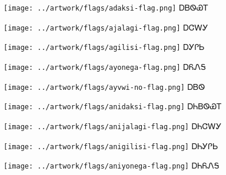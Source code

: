 \documentclass[avery5371]{flashcards}%
\begin{document}

\begin{flashcard}{
\texttt{[image: ../artwork/flags/adaksi-flag.png]}
}\Huge ᎠᏴᏫᏯᎢ
\end{flashcard}

\begin{flashcard}{
\texttt{[image: ../artwork/flags/ajalagi-flag.png]}
}\Huge ᎠᏣᎳᎩ
\end{flashcard}

\begin{flashcard}{
\texttt{[image: ../artwork/flags/agilisi-flag.png]}
}\Huge ᎠᎩᎵᏏ
\end{flashcard}

\begin{flashcard}{
\texttt{[image: ../artwork/flags/ayonega-flag.png]}
}\Huge ᎠᏲᏁᎦ
\end{flashcard}

\begin{flashcard}{
\texttt{[image: ../artwork/flags/ayvwi-no-flag.png]}
}\Huge ᎠᏴᏫ
\end{flashcard}


\begin{flashcard}{
\texttt{[image: ../artwork/flags/anidaksi-flag.png]}
}\Huge ᎠᏂᏴᏫᏯᎢ
\end{flashcard}

\begin{flashcard}{
\texttt{[image: ../artwork/flags/anijalagi-flag.png]}
}\Huge ᎠᏂᏣᎳᎩ
\end{flashcard}

\begin{flashcard}{
\texttt{[image: ../artwork/flags/anigilisi-flag.png]}
}\Huge ᎠᏂᎩᎵᏏ
\end{flashcard}

\begin{flashcard}{
\texttt{[image: ../artwork/flags/aniyonega-flag.png]}
}\Huge ᎠᏂᏲᏁᎦ
\end{flashcard}
\end{document}
